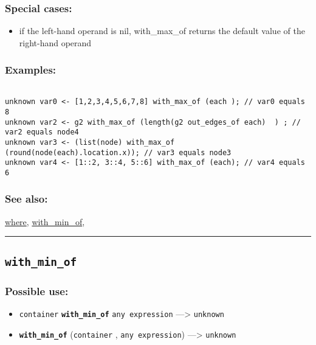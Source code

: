 \documentclass[]{book}
\providecommand{\tightlist}{%
  \setlength{\itemsep}{0pt}\setlength{\parskip}{0pt}}
\theoremstyle{definition}
\theoremstyle{definition}
\theoremstyle{definition}
\theoremstyle{remark}
\begin{document}
\subsubsection{Special cases:}\label{special-cases-147}

\begin{itemize}
\tightlist
\item
  if the left-hand operand is nil, with\_max\_of returns the default
  value of the right-hand operand
\end{itemize}

\subsubsection{Examples:}\label{examples-384}

\begin{verbatim}
 
unknown var0 <- [1,2,3,4,5,6,7,8] with_max_of (each ); // var0 equals 8 
unknown var2 <- g2 with_max_of (length(g2 out_edges_of each)  ) ; // var2 equals node4 
unknown var3 <- (list(node) with_max_of (round(node(each).location.x)); // var3 equals node3 
unknown var4 <- [1::2, 3::4, 5::6] with_max_of (each); // var4 equals 6
\end{verbatim}

\subsubsection{See also:}\label{see-also-221}

\href{OperatorsSZ\#where}{where},
\href{OperatorsSZ\#with_min_of}{with\_min\_of},

\begin{center}\rule{0.5\linewidth}{\linethickness}\end{center}

\subsection{\texorpdfstring{\texttt{with\_min\_of}}{with\_min\_of}}\label{with_min_of}

\subsubsection{Possible use:}\label{possible-use-558}

\begin{itemize}
\tightlist
\item
  \texttt{container} \textbf{\texttt{with\_min\_of}}
  \texttt{any\ expression} ---\textgreater{} \texttt{unknown}
\item
  \textbf{\texttt{with\_min\_of}} (\texttt{container} ,
  \texttt{any\ expression}) ---\textgreater{} \texttt{unknown}
\end{itemize}
\end{document}
